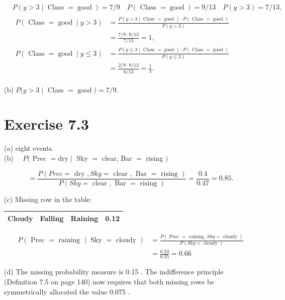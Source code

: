 \documentclass[10pt]{book}
\begin{document}
$$
\begin{aligned}
& P(y>3 \mid \text { Class }=\operatorname{good})=7 / 9 \quad P(\text { Class }=\operatorname{good})=9 / 13 \quad P(y>3)=7 / 13, \\
& \begin{aligned}
P(\text { Class }=\operatorname{good} \mid y>3) & =\frac{P(y>3 \mid \text { Class }=\operatorname{good}) \cdot P(\text { Class }=\operatorname{good})}{P(y>3)} \\
& =\frac{7 / 9 \cdot 9 / 13}{7 / 13}=1, \\
P(\text { Class }=\operatorname{good} \mid y \leq 3) & =\frac{P(y \leq 3 \mid \text { Class }=\operatorname{good}) \cdot P(\text { Class }=\operatorname{good})}{P(y \leq 3)} \\
& =\frac{2 / 9 \cdot 9 / 13}{6 / 13}=\frac{1}{3} .
\end{aligned}
\end{aligned}
$$

(b) $P(y>3 \mid$ Class $=\operatorname{good})=7 / 9$.

\section{Exercise 7.3}
(a) eight events.\\
(b) $\quad P($ Prec $=\mathrm{dry} \mid$ Sky $=$ clear, Bar $=$ rising $)$

$$
=\frac{P(P r e c=\text { dry }, S k y=\text { clear }, \text { Bar }=\text { rising })}{P(S k y=\text { clear }, \text { Bar }=\text { rising })}=\frac{0.4}{0.47}=0.85 .
$$

(c) Missing row in the table:

\begin{center}
\begin{tabular}{llll}
\hline
Cloudy & Falling & Raining & 0.12 \\
\hline
\end{tabular}
\end{center}

$$
\begin{aligned}
P(\text { Prec }=\text { raining } \mid \text { Sky }=\text { cloudy }) & =\frac{P(\text { Prec }=\text { raining, } S k y=\text { cloudy })}{P(S k y=\text { cloudy })} \\
& =\frac{0.23}{0.35}=0.66
\end{aligned}
$$

(d) The missing probability measure is 0.15 . The indifference principle (Definition 7.5 on page 140) now requires that both missing rows be symmetrically allocated the value 0.075 .
\end{document}
